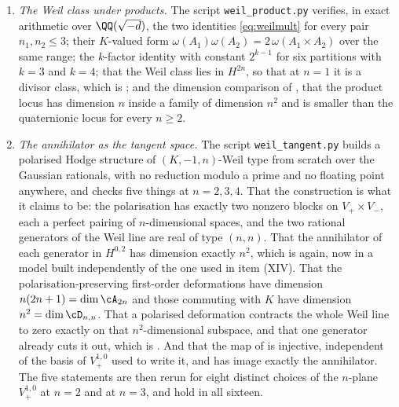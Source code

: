 \begin{enumerate}[label=\textup{(\Roman*)},leftmargin=*]
\item \emph{The Weil class under products.} The script
  \texttt{weil\_product.py} verifies, in exact arithmetic over
  $\QQ(\sqrt{-d})$, the two identities \eqref{eq:weilmult} for every pair
  $n_{1},n_{2}\le3$; their $K$-valued form
  $\omega(A_{1})\omega(A_{2})=2\,\omega(A_{1}\times A_{2})$ over the same
  range; the $k$-factor identity with constant $2^{k-1}$ for six partitions
  with $k=3$ and $k=4$; that the Weil class lies in $H^{2n}$, so that at
  $n=1$ it is a divisor class, which is ; and the
  dimension comparison of , that the product locus has
  dimension $n$ inside a family of dimension $n^{2}$ and is smaller than the
  quaternionic locus for every $n\ge2$.

\item \emph{The annihilator as the tangent space.} The script
  \texttt{weil\_tangent.py} builds a polarised Hodge structure of
  $(K,-1,n)$-Weil type from scratch over the Gaussian rationals, with no
  reduction modulo a prime and no floating point anywhere, and checks five
  things at $n=2,3,4$. That the construction is what it claims to be: the
  polarisation has exactly two nonzero blocks on $V_{+}\times V_{-}$, each a
  perfect pairing of $n$-dimensional spaces, and the two rational generators
  of the Weil line are real of type $(n,n)$. That the annihilator of each
  generator in $H^{0,2}$ has dimension exactly $n^{2}$, which is
   again, now in a model built independently of the one
  used in item (XIV). That the polarisation-preserving first-order
  deformations have dimension $n(2n+1)=\dim\cA_{2n}$ and those commuting with
  $K$ have dimension $n^{2}=\dim\cD_{n,n}$. That a polarised deformation
  contracts the whole Weil line to zero exactly on that $n^{2}$-dimensional
  subspace, and that one generator already cuts it out, which is
  . And that the map of  is
  injective, independent of the basis of $V_{+}^{1,0}$ used to write it, and
  has image exactly the annihilator. The five statements are then rerun for
  eight distinct choices of the $n$-plane $V_{+}^{1,0}$ at $n=2$ and at $n=3$,
  and hold in all sixteen.


\end{enumerate}
